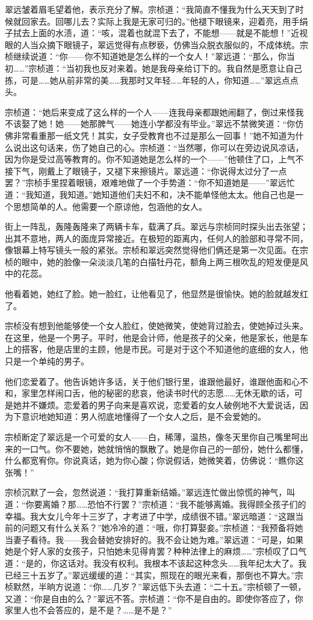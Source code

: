 \par 翠远皱着眉毛望着他，表示充分了解。宗桢道：“我简直不懂我为什么天天到了时候就回家去。回哪儿去？实际上我是无家可归的。”他褪下眼镜来，迎着亮，用手绢子拭去上面的水渍，道：“咳，混着也就混下去了，不能想——就是不能想！”近视眼的人当众摘下眼镜子，翠远觉得有点秽亵，仿佛当众脱衣服似的，不成体统。宗桢继续说道：“你——你不知道她是怎么样的一个女人！”翠远道：“那么，你当初……”宗桢道：“当初我也反对来着。她是我母亲给订下的。我自然是愿意让自己拣，可是……她从前非常的美……我那时又年轻……年轻的人，你知道……”翠远点点头。
\par 宗桢道：“她后来变成了这么样的一个人——连我母亲都跟她闹翻了，倒过来怪我不该娶了她！她——她那脾气——她连小学都没有毕业。”翠远不禁微笑道：“你仿佛非常看重那一纸文凭！其实，女子受教育也不过是那么一回事！”她不知道为什么说出这句话来，伤了她自己的心。宗桢道：“当然哪，你可以在旁边说风凉话，因为你是受过高等教育的。你不知道她是怎么样的一个——”他顿住了口，上气不接下气，刚戴上了眼镜子，又褪下来擦镜片。翠远道：“你说得太过分了一点罢？”宗桢手里捏着眼镜，艰难地做了一个手势道：“你不知道她是——”翠远忙道：“我知道，我知道。”她知道他们夫妇不和，决不能单怪他太太。他自己也是一个思想简单的人。他需要一个原谅他，包涵他的女人。
\par 街上一阵乱，轰隆轰隆来了两辆卡车，载满了兵。翠远与宗桢同时探头出去张望；出其不意地，两人的面庞异常接近。在极短的距离内，任何人的脸部和寻常不同，像银幕上特写镜头一般的紧张。宗桢和翠远突然觉得他们俩还是第一次见面。在宗桢的眼中，她的脸像一朵淡淡几笔的白描牡丹花，额角上两三根吹乱的短发便是风中的花蕊。
\par 他看着她，她红了脸。她一脸红，让他看见了，他显然是很愉快。她的脸就越发红了。
\par 宗桢没有想到他能够使一个女人脸红，使她微笑，使她背过脸去，使她掉过头来。在这里，他是一个男子。平时，他是会计师，他是孩子的父亲，他是家长，他是车上的搭客，他是店里的主顾，他是市民。可是对于这个不知道他的底细的女人，他只是一个单纯的男子。
\par 他们恋爱着了。他告诉她许多话，关于他们银行里，谁跟他最好，谁跟他面和心不和，家里怎样闹口舌，他的秘密的悲哀，他读书时代的志愿……无休无歇的话，可是她并不嫌烦。恋爱着的男子向来是喜欢说，恋爱着的女人破例地不大爱说话，因为下意识地她知道：男人彻底地懂得了一个女人之后，是不会爱她的。
\par 宗桢断定了翠远是一个可爱的女人——白，稀薄，温热，像冬天里你自己嘴里呵出来的一口气。你不要她，她就悄悄的飘散了。她是你自己的一部份，她什么都懂，什么都宽宥你。你说真话，她为你心酸；你说假话，她微笑着，仿佛说：“瞧你这张嘴！”
\par 宗桢沉默了一会，忽然说道：“我打算重新结婚。”翠远连忙做出惊慌的神气，叫道：“你要离婚？那……恐怕不行罢？”宗桢道：“我不能够离婚。我得顾全孩子们的幸福。我大女儿今年十三岁了，才考进了中学，成绩很不错。”翠远暗道：“这跟当前的问题又有什么关系？”她冷冷的道：“哦，你打算娶妾。”宗桢道：“我预备将她当妻子看待。我——我会替她安排好的。我不会让她为难。”翠远道：“可是，如果她是个好人家的女孩子，只怕她未见得肯罢？种种法律上的麻烦……”宗桢叹了口气道：“是的，你这话对。我没有权利。我根本不该起这种念头……我年纪太大了。我已经三十五岁了。”翠远缓缓的道：“其实，照现在的眼光来看，那倒也不算大。”宗桢默然，半晌方说道：“你……几岁？”翠远低下头去道：“二十五。”宗桢顿了一顿，又道：“你是自由的么？”翠远不答。宗桢道：“你不是自由的。即使你答应了，你家里人也不会答应的，是不是？……是不是？”
